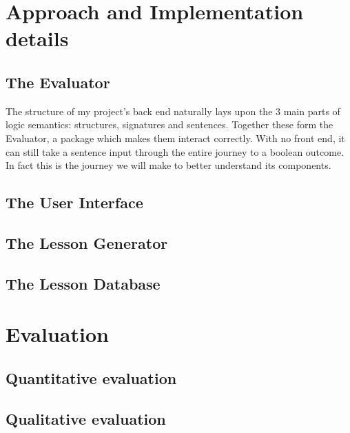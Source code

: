 \documentclass{report}
\begin{document}

\chapter{Approach and Implementation details}

\section{The Evaluator}
The structure of my project's back end naturally lays upon the 3 main parts of
logic semantics: structures, signatures and sentences. Together these form the
Evaluator, a package which makes them interact correctly. With no front end, it
can still take a sentence input through the entire journey to a boolean outcome.
In fact this is the journey we will make to better understand its components.
\section{The User Interface}
\section{The Lesson Generator}
\section{The Lesson Database}


\chapter{Evaluation}
\section{Quantitative evaluation}
\section{Qualitative evaluation}

\end{document}
